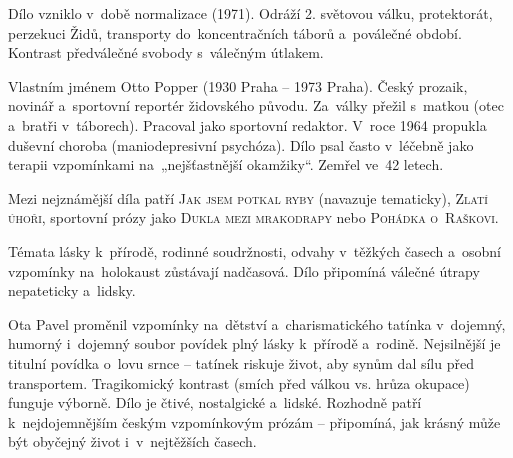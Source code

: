 \documentclass[FGBook.tex]{subfiles}
\begin{document}
\noindent Dílo vzniklo v~době normalizace (1971). Odráží 2. světovou válku, protektorát, perzekuci Židů, transporty do~koncentračních táborů a~poválečné období. Kontrast předválečné svobody s~válečným útlakem.

\noindent Vlastním jménem Otto Popper (1930 Praha – 1973 Praha). Český prozaik, novinář a~sportovní reportér židovského původu. Za~války přežil s~matkou (otec a~bratři v~táborech). Pracoval jako sportovní redaktor. V~roce 1964 propukla duševní choroba (maniodepresivní psychóza). Dílo psal často v~léčebně jako terapii vzpomínkami na~„nejšťastnější okamžiky“. Zemřel ve~42 letech.

\noindent Mezi nejznámější díla patří \textsc{Jak jsem potkal ryby} (navazuje tematicky), \textsc{Zlatí úhoři}, sportovní prózy jako \textsc{Dukla mezi mrakodrapy} nebo \textsc{Pohádka o~Raškovi}.

\noindent Témata lásky k~přírodě, rodinné soudržnosti, odvahy v~těžkých časech a~osobní vzpomínky na~holokaust zůstávají nadčasová. Dílo připomíná válečné útrapy nepateticky a~lidsky.

\noindent Ota Pavel proměnil vzpomínky na~dětství a~charismatického tatínka v~dojemný, humorný i~dojemný soubor povídek plný lásky k~přírodě a~rodině. Nejsilnější je titulní povídka o~lovu srnce – tatínek riskuje život, aby synům dal sílu před transportem. Tragikomický kontrast (smích před válkou vs. hrůza okupace) funguje výborně. Dílo je čtivé, nostalgické a~lidské. Rozhodně patří k~nejdojemnějším českým vzpomínkovým prózám – připomíná, jak krásný může být obyčejný život i~v~nejtěžších časech.

\newpage
\end{document}
